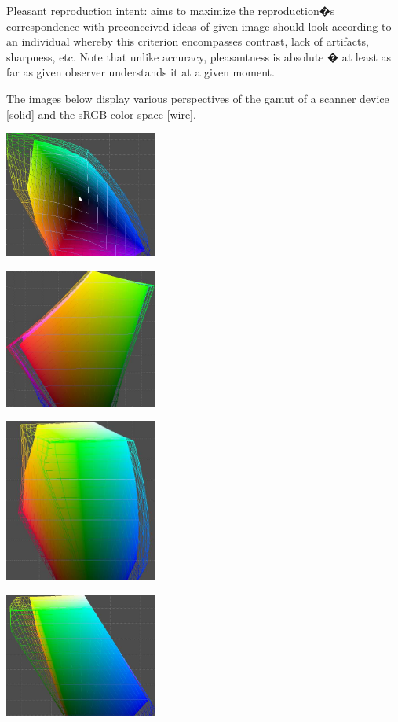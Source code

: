 \documentclass{amsart}
\theoremstyle{definition}
\theoremstyle{remark}
\numberwithin{equation}{section}
\begin{document}
Pleasant reproduction intent: aims to maximize the reproduction�s correspondence with preconceived
ideas of given image should look according to an individual whereby this criterion encompasses
contrast, lack of artifacts, sharpness, etc. Note that unlike accuracy, pleasantness is absolute � at
least as far as given observer understands it at a given moment.

The images below display various perspectives of the gamut of a scanner device [solid] and the sRGB color space [wire].

\includegraphics[width=5.0cm]{aperio_sRGB_v1.jpg}

\includegraphics[width=5.0cm]{aperio_sRGB_v2.jpg}

\includegraphics[width=5.0cm]{aperio_sRGB_v3.jpg}

\includegraphics[width=5.0cm]{aperio_sRGB_v4.jpg}
\end{document}
